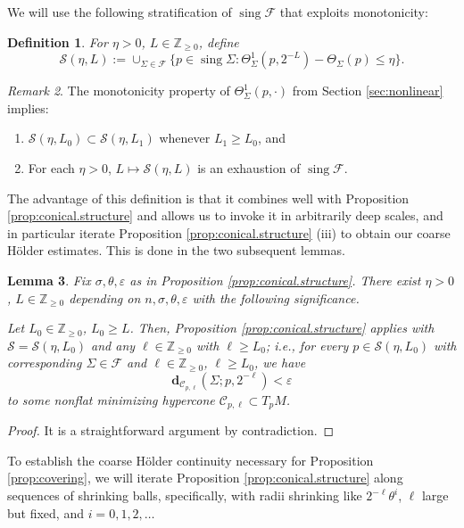 \documentclass[11pt, letterpaper, reqno]{amsart}
\numberwithin{equation}{section}
\newtheorem{Def}{Definition}[section]
\newtheorem{Lem}[Def]{Lemma}
\theoremstyle{remark}
\newtheorem{Rem}[Def]{Remark}
\newcommand{\ZZ}{\mathbb{Z}}
\newcommand{\cC}{\mathcal{C}}
\newcommand{\cS}{\mathcal{S}}
\newcommand{\mbfd}{\mathbf{d}}
\newcommand{\sing}{\operatorname{sing}}
\newcommand{\eps}{\varepsilon}
\begin{document}
We will use the following stratification of $\sing \mathscr{F}$ that exploits monotonicity:

\begin{Def} \label{defi:conical.stratification}
	For $\eta > 0$, $L \in \ZZ_{\geq 0}$, define
	\[ \cS(\eta, L) := \cup_{\Sigma \in \mathscr{F}} \{ p \in \sing \Sigma : \Theta^1_\Sigma(p, 2^{-L}) - \Theta_\Sigma(p) \leq \eta \}. \]
\end{Def}

\begin{Rem} \label{rema:conical.stratification}
The monotonicity property of $\Theta^1_\Sigma(p, \cdot)$ from Section \ref{sec:nonlinear} implies:
\begin{enumerate}
	\item $\cS(\eta, L_0) \subset \cS(\eta, L_1)$ whenever $L_1 \geq L_0$, and
	\item For each $\eta > 0$, $L \mapsto \cS(\eta, L)$ is an exhaustion of $\sing \mathscr{F}$.
\end{enumerate}
\end{Rem}

The advantage of this definition is that it combines well with Proposition \ref{prop:conical.structure} and allows us to invoke it in arbitrarily deep scales, and in particular iterate Proposition \ref{prop:conical.structure} (iii) to obtain our coarse H\"older estimates. This is done in the two subsequent lemmas.

\begin{Lem} \label{lemm:conical.structure}
	Fix $\sigma,  \theta, \eps$ as in Proposition \ref{prop:conical.structure}. There exist $\eta > 0$, $L \in \ZZ_{\geq 0}$ depending on $n, \sigma, \theta, \eps$ with the following significance.
	
	Let $L_0 \in \ZZ_{\geq 0}$, $L_0 \geq L$. Then, Proposition \ref{prop:conical.structure} applies with $\cS = \cS(\eta, L_0)$ and any $\ell \in \ZZ_{\geq 0}$ with $\ell \geq L_0$; i.e., for every $p \in \cS(\eta, L_0)$ with corresponding $\Sigma \in \mathscr{F}$ and $\ell \in \ZZ_{\geq 0}$, $\ell \geq L_0$, we have 
	\[ \mbfd_{\cC_{p,\ell}}(\Sigma; p, 2^{-\ell}) < \eps \]
	to some nonflat minimizing hypercone $\cC_{p,\ell} \subset T_{p} M$.
\end{Lem}
\begin{proof}
	It is a straightforward argument by contradiction.
\end{proof}





To establish the coarse H\"older continuity necessary for Proposition \ref{prop:covering}, we will iterate Proposition \ref{prop:conical.structure} along sequences of shrinking balls, specifically, with radii shrinking like $2^{-\ell} \theta^i$, $\ell$ large but fixed, and $i = 0, 1, 2, \ldots$
\end{document}
